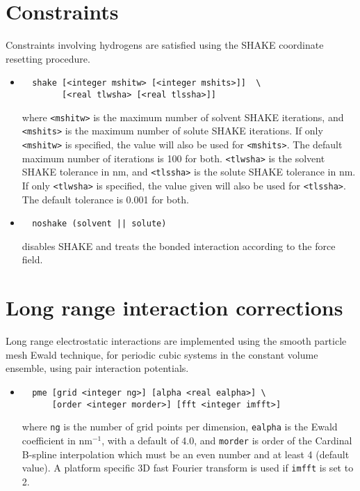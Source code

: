 \section{Constraints}
Constraints involving hydrogens are satisfied using the SHAKE 
coordinate resetting procedure.
\begin{itemize}
\item
\begin{verbatim}
  shake [<integer mshitw> [<integer mshits>]]  \
        [<real tlwsha> [<real tlssha>]]
\end{verbatim}
where \verb+<mshitw>+ is the maximum number of solvent SHAKE iterations,
and \verb+<mshits>+ is the maximum number of solute SHAKE iterations. If
only \verb+<mshitw>+ is specified, the value will also be used for \verb+<mshits>+.
The default maximum number of iterations is 100 for both.
\verb+<tlwsha>+ is the solvent SHAKE tolerance in nm, and \verb+<tlssha>+ is
the solute SHAKE tolerance in nm. If only \verb+<tlwsha>+ is specified, the
value given will also be used for \verb+<tlssha>+. The default tolerance
is 0.001 for both.
\item
\begin{verbatim}
  noshake (solvent || solute)
\end{verbatim}
disables SHAKE and treats the bonded interaction according to the
force field.
\end{itemize}

\section{Long range interaction corrections}
Long range electrostatic interactions are implemented using the
smooth particle mesh Ewald technique, for periodic cubic systems in
the constant volume ensemble, using pair interaction potentials.
\begin{itemize}
\item
\begin{verbatim}
  pme [grid <integer ng>] [alpha <real ealpha>] \
      [order <integer morder>] [fft <integer imfft>] 
\end{verbatim}
where \verb+ng+ is the number of grid points per dimension, 
\verb+ealpha+ is the Ewald coefficient in nm$^{-1}$, with a default 
of 4.0, and \verb+morder+ is order of the Cardinal B-spline
interpolation which must be an even number and at least 4 (default
value). A platform specific 3D fast Fourier transform is used if
\verb+imfft+ is set to 2.
\end{itemize}


